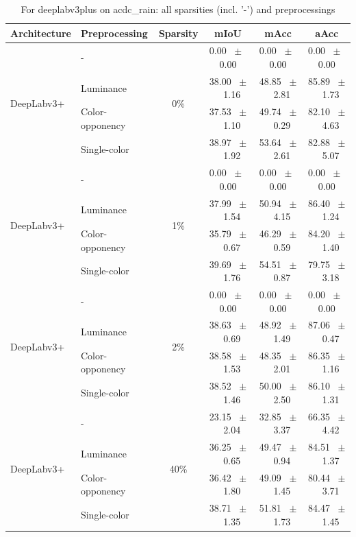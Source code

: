 \begin{table}[h]
  \centering
  \caption{For deeplabv3plus on acdc_rain: all sparsities (incl. '-') and preprocessings}
  \begin{tabular}{@{}l l c c c c@{}}
    \toprule
    Architecture & Preprocessing & Sparsity & mIoU & mAcc & aAcc \\
    \midrule
    \multirow{4}{*}{DeepLabv3+} & - & \multirow{4}{*}{0\%} & 0.00 ~$\pm$~ 0.00 & 0.00 ~$\pm$~ 0.00 & 0.00 ~$\pm$~ 0.00 \\
    & Luminance &  & 38.00 ~$\pm$~ 1.16 & 48.85 ~$\pm$~ 2.81 & 85.89 ~$\pm$~ 1.73 \\
    & Color-opponency &  & 37.53 ~$\pm$~ 1.10 & 49.74 ~$\pm$~ 0.29 & 82.10 ~$\pm$~ 4.63 \\
    & Single-color &  & 38.97 ~$\pm$~ 1.92 & 53.64 ~$\pm$~ 2.61 & 82.88 ~$\pm$~ 5.07 \\
    \midrule
    \multirow{4}{*}{DeepLabv3+} & - & \multirow{4}{*}{1\%} & 0.00 ~$\pm$~ 0.00 & 0.00 ~$\pm$~ 0.00 & 0.00 ~$\pm$~ 0.00 \\
    & Luminance &  & 37.99 ~$\pm$~ 1.54 & 50.94 ~$\pm$~ 4.15 & 86.40 ~$\pm$~ 1.24 \\
    & Color-opponency &  & 35.79 ~$\pm$~ 0.67 & 46.29 ~$\pm$~ 0.59 & 84.20 ~$\pm$~ 1.40 \\
    & Single-color &  & 39.69 ~$\pm$~ 1.76 & 54.51 ~$\pm$~ 0.87 & 79.75 ~$\pm$~ 3.18 \\
    \midrule
    \multirow{4}{*}{DeepLabv3+} & - & \multirow{4}{*}{2\%} & 0.00 ~$\pm$~ 0.00 & 0.00 ~$\pm$~ 0.00 & 0.00 ~$\pm$~ 0.00 \\
    & Luminance &  & 38.63 ~$\pm$~ 0.69 & 48.92 ~$\pm$~ 1.49 & 87.06 ~$\pm$~ 0.47 \\
    & Color-opponency &  & 38.58 ~$\pm$~ 1.53 & 48.35 ~$\pm$~ 2.01 & 86.35 ~$\pm$~ 1.16 \\
    & Single-color &  & 38.52 ~$\pm$~ 1.46 & 50.00 ~$\pm$~ 2.50 & 86.10 ~$\pm$~ 1.31 \\
    \midrule
    \multirow{4}{*}{DeepLabv3+} & - & \multirow{4}{*}{40\%} & 23.15 ~$\pm$~ 2.04 & 32.85 ~$\pm$~ 3.37 & 66.35 ~$\pm$~ 4.42 \\
    & Luminance &  & 36.25 ~$\pm$~ 0.65 & 49.47 ~$\pm$~ 0.94 & 84.51 ~$\pm$~ 1.37 \\
    & Color-opponency &  & 36.42 ~$\pm$~ 1.80 & 49.09 ~$\pm$~ 1.45 & 80.44 ~$\pm$~ 3.71 \\
    & Single-color &  & 38.71 ~$\pm$~ 1.35 & 51.81 ~$\pm$~ 1.73 & 84.47 ~$\pm$~ 1.45 \\
    \midrule

\end{tabular}
\end{table}
